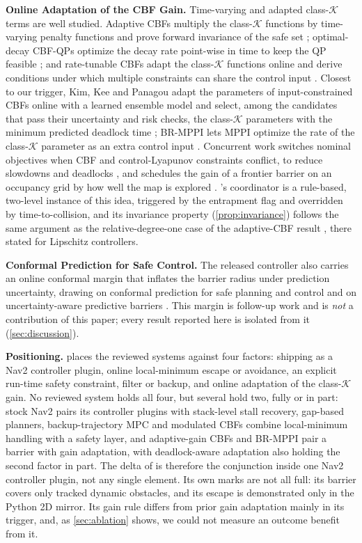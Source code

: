 \noindent\textbf{Online Adaptation of the CBF Gain.} Time-varying and adapted class-$\mathcal{K}$ terms are well studied. Adaptive CBFs multiply the class-$\mathcal{K}$ functions by time-varying penalty functions and prove forward invariance of the safe set \citep{ada_cbf}; optimal-decay CBF-QPs optimize the decay rate point-wise in time to keep the QP feasible \citep{optdecay_cbf}; and rate-tunable CBFs adapt the class-$\mathcal{K}$ functions online and derive conditions under which multiple constraints can share the control input \citep{rt_cbf}. Closest to our trigger, Kim, Kee and Panagou adapt the parameters of input-constrained CBFs online with a learned ensemble model and select, among the candidates that pass their uncertainty and risk checks, the class-$\mathcal{K}$ parameters with the minimum predicted deadlock time \citep{kim_adaptive_cbf}; BR-MPPI lets MPPI optimize the rate of the class-$\mathcal{K}$ parameter as an extra control input \citep{br_mppi}. Concurrent work switches nominal objectives when CBF and control-Lyapunov constraints conflict, to reduce slowdowns and deadlocks \citep{walia_conflict}, and schedules the gain of a frontier barrier on an occupancy grid by how well the map is explored \citep{paudel_dualbarrier}. \sname's coordinator is a rule-based, two-level instance of this idea, triggered by the entrapment flag and overridden by time-to-collision, and its invariance property (\cref{prop:invariance}) follows the same argument as the relative-degree-one case of the adaptive-CBF result \citep[Thm.~3]{ada_cbf}, there stated for Lipschitz controllers.

\noindent\textbf{Conformal Prediction for Safe Control.} The released controller also carries an online conformal margin that inflates the barrier radius under prediction uncertainty, drawing on conformal prediction for safe planning and control \citep{acp_yang,conformal_hri,lindemann,dixit} and on uncertainty-aware predictive barriers \citep{ua_pcbf}. This margin is follow-up work and is \emph{not} a contribution of this paper; every result reported here is isolated from it (\cref{sec:discussion}).



\noindent\textbf{Positioning.}  places the reviewed systems against four factors: shipping as a Nav2 controller plugin, online local-minimum escape or avoidance, an explicit run-time safety constraint, filter or backup, and online adaptation of the class-$\mathcal{K}$ gain. No reviewed system holds all four, but several hold two, fully or in part: stock Nav2 pairs its controller plugins with stack-level stall recovery, gap-based planners, backup-trajectory MPC and modulated CBFs combine local-minimum handling with a safety layer, and adaptive-gain CBFs and BR-MPPI pair a barrier with gain adaptation, with deadlock-aware adaptation also holding the second factor in part. The delta of \sname{} is therefore the conjunction inside one Nav2 controller plugin, not any single element. Its own marks are not all full: its barrier covers only tracked dynamic obstacles, and its escape is demonstrated only in the Python 2D mirror. Its gain rule differs from prior gain adaptation mainly in its trigger, and, as \cref{sec:ablation} shows, we could not measure an outcome benefit from it.
